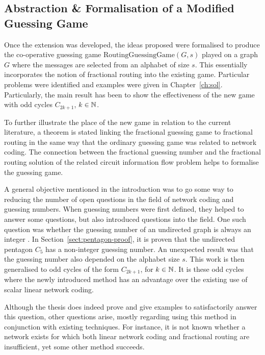 \newpage

\subsection{Abstraction \& Formalisation of a Modified Guessing Game}

Once the extension was developed, the ideas proposed were formalised to produce the co-operative guessing game $\mathrm{RoutingGuessingGame}(G, s)$ played on a graph $G$ where the messages are selected from an alphabet of size $s$. This essentially incorporates the notion of fractional routing into the existing game. Particular problems were identified and examples were given in Chapter~\ref{ch:sol}. Particularly, the main result has been to show the effectiveness of the new game with odd cycles $C_{2k + 1}$, $k \in \mathbb{N}$.

To further illustrate the place of the new game in relation to the current literature, a theorem is stated linking the fractional guessing game to fractional routing in the same way that the ordinary guessing game was related to network coding. The connection between the fractional guessing number and the fractional routing solution of the related circuit information flow problem helps to formalise the guessing game.

A general objective mentioned in the introduction was to go some way to reducing the number of open questions in the field of network coding and guessing numbers. When guessing numbers were first defined, they helped to answer some questions, but also introduced questions into the field. One such question was whether the guessing number of an undirected graph is always an integer \cite{riis2005util}. In Section~\ref{sect:pentagon-proof}, it is proven that the undirected pentagon $C_5$ has a non-integer guessing number. An unexpected result was that the guessing number also depended on the alphabet size $s$. This work is then generalised to odd cycles of the form $C_{2k + 1}$, for $k \in \mathbb{N}$. It is these odd cycles where the newly introduced method has an advantage over the existing use of scalar linear network coding.

Although the thesis does indeed prove and give examples to satisfactorily answer this question, other questions arise, mostly regarding using this method in conjunction with existing techniques. For instance, it is not known whether a network exists for which both linear network coding and fractional routing are insufficient, yet some other method succeeds.

